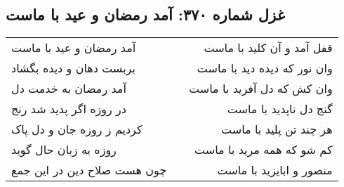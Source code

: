\begin{center}
\section*{غزل شماره ۳۷۰: آمد رمضان و عید با ماست}
\label{sec:0370}
\begin{longtable}{l p{0.5cm} r}
آمد رمضان و عید با ماست
&&
قفل آمد و آن کلید با ماست
\\
بربست دهان و دیده بگشاد
&&
وان نور که دیده دید با ماست
\\
آمد رمضان به خدمت دل
&&
وان کش که دل آفرید با ماست
\\
در روزه اگر پدید شد رنج
&&
گنج دل ناپدید با ماست
\\
کردیم ز روزه جان و دل پاک
&&
هر چند تن پلید با ماست
\\
روزه به زبان حال گوید
&&
کم شو که همه مرید با ماست
\\
چون هست صلاح دین در این جمع
&&
منصور و ابایزید با ماست
\\
\end{longtable}
\end{center}
